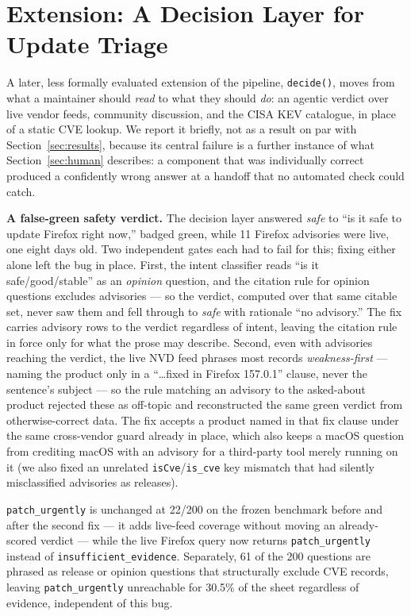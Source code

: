 \documentclass[10pt,conference]{IEEEtran}
\begin{document}
\section{Extension: A Decision Layer for Update Triage}\label{sec:decision-layer}

A later, less formally evaluated extension of the pipeline, \texttt{decide()},
moves from what a maintainer should \emph{read} to what they should \emph{do}:
an agentic verdict over live vendor feeds, community discussion, and the CISA
KEV catalogue, in place of a static CVE lookup. We report it briefly, not as a
result on par with Section~\ref{sec:results}, because its central failure is a
further instance of what Section~\ref{sec:human} describes: a component that
was individually correct produced a confidently wrong answer at a handoff that
no automated check could catch.

\textbf{A false-green safety verdict.}\label{sec:false-green}
The decision layer answered \emph{safe} to ``is it safe to update Firefox right
now,'' badged green, while 11 Firefox advisories were live, one eight days old.
Two independent gates each had to fail for this; fixing either alone left the
bug in place. First, the intent classifier reads ``is it safe/good/stable''
as an \emph{opinion} question, and the citation rule for opinion questions
excludes advisories --- so the verdict, computed over that same citable set,
never saw them and fell through to \emph{safe} with rationale ``no advisory.''
The fix carries advisory rows to the verdict regardless of intent, leaving the
citation rule in force only for what the prose may describe. Second, even with
advisories reaching the verdict, the live NVD feed phrases most records
\emph{weakness-first} --- naming the product only in a ``\ldots fixed in
Firefox 157.0.1'' clause, never the sentence's subject --- so the rule matching
an advisory to the asked-about product rejected these as off-topic and
reconstructed the same green verdict from otherwise-correct data. The fix
accepts a product named in that fix clause under the same cross-vendor guard
already in place, which also keeps a macOS question from crediting macOS with
an advisory for a third-party tool merely running on it (we also fixed an
unrelated \texttt{isCve}/\texttt{is\_cve} key mismatch that had silently
misclassified advisories as releases).

\texttt{patch\_urgently} is unchanged at 22/200 on the frozen benchmark before
and after the second fix --- it adds live-feed coverage without moving an
already-scored verdict --- while the live Firefox query now returns
\texttt{patch\_urgently} instead of \texttt{insufficient\_evidence}. Separately,
61 of the 200 questions are phrased as release or opinion questions that
structurally exclude CVE records, leaving \texttt{patch\_urgently} unreachable
for 30.5\% of the sheet regardless of evidence, independent of this bug.
\end{document}
